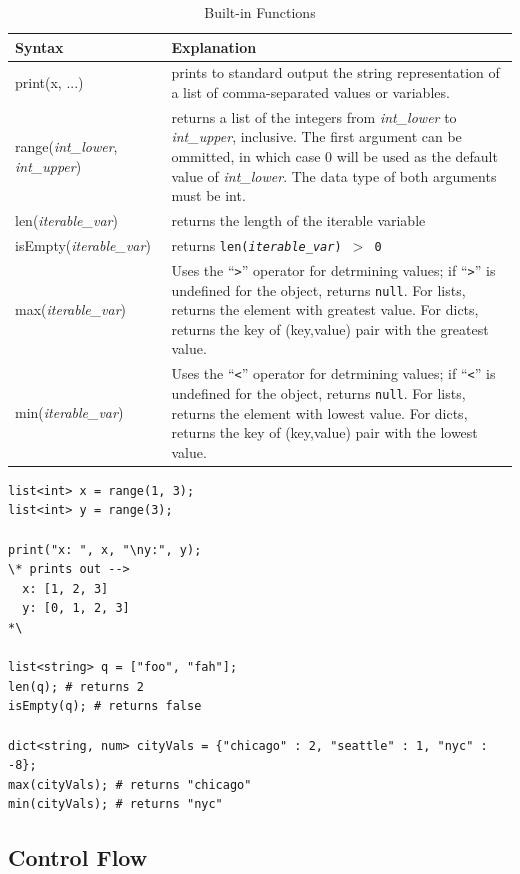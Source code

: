 \documentclass{article}
\newcommand{\code}[1]{\texttt{#1}} %
\begin{document}
\begin{table}[H]
\centering
\begin{tabular}{| p{2.75in} | p{2.5in} |}
\hline
Syntax & Explanation \\
\hline
print(x, ...) & prints to standard output the string representation of a list of comma-separated values or variables. \\
\hline
range(\emph{int\_lower}, \emph{int\_upper}) & returns a list of the integers from \emph{int\_lower} to \emph{int\_upper}, inclusive. The first argument can be ommitted, in which case 0 will be used as the default value of \emph{int\_lower}. The data type of both arguments must be int. \\
\hline
len(\emph{iterable\_var}) & returns the length of the iterable variable \\
\hline
isEmpty(\emph{iterable\_var}) & returns \code{len(\emph{iterable\_var}) $>$ 0} \\
\hline
max(\emph{iterable\_var}) & Uses the ``\code{>}'' operator for detrmining values; if ``\code{>}'' is undefined for the object, returns \code{null}. For lists, returns the element with greatest value. For dicts, returns the key of (key,value) pair with the greatest value. \\
\hline
min(\emph{iterable\_var}) & Uses the ``\code{<}'' operator for detrmining values; if ``\code{<}'' is undefined for the object, returns \code{null}. For lists, returns the element with lowest value. For dicts, returns the key of (key,value) pair with the lowest value. \\
\hline
\end{tabular}
\caption{Built-in Functions}
\label{tbl:functs}
\end{table}

\begin{lstlisting}[language=pltLang, caption=Shows the use of built-in functions., label=lst:functs]
list<int> x = range(1, 3);
list<int> y = range(3);

print("x: ", x, "\ny:", y);
\* prints out -->
  x: [1, 2, 3]
  y: [0, 1, 2, 3]
*\

list<string> q = ["foo", "fah"];
len(q); # returns 2
isEmpty(q); # returns false

dict<string, num> cityVals = {"chicago" : 2, "seattle" : 1, "nyc" : -8};
max(cityVals); # returns "chicago"
min(cityVals); # returns "nyc"

\end{lstlisting}

\subsection{Control Flow}
\end{document}
